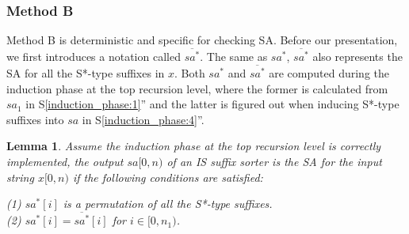 \documentclass[10pt,journal,compsoc]{IEEEtran}
\newtheorem{lemma}[theorem]{Lemma}
\begin{document}

\begin{algorithm*}

	\caption{The Algorithm Based on Lemma~\ref{lemma:3}.}
	
	\label{alg:2}
	
	\end{algorithm*}


\subsubsection{Method B}\label{sec:proposals:method_b}

Method B is deterministic and specific for checking SA. Before our presentation, we first introduces a notation called $\overline{sa^*}$. The same as $sa^*$, $\overline{sa^*}$ also represents the SA for all the S*-type suffixes in $x$. Both $sa^*$ and $\overline{sa^*}$ are computed during the induction phase at the top recursion level, where the former is calculated from $sa_1$ in S\ref{induction_phase:1}'' and the latter is figured out when inducing S*-type suffixes into $sa$ in S\ref{induction_phase:4}''. 

\begin{lemma} \label{lemma:4}
    Assume the induction phase at the top recursion level is correctly implemented, the output $sa[0, n)$ of an IS suffix sorter is the SA for the input string $x[0, n)$ if the following conditions are satisfied:

	(1) $sa^*[i]$ is a permutation of all the S*-type suffixes. \\
	(2) $sa^*[i] = \overline{sa^*}[i]$ for $i \in [0, n_1)$. \\
\end{lemma}
\end{document}
